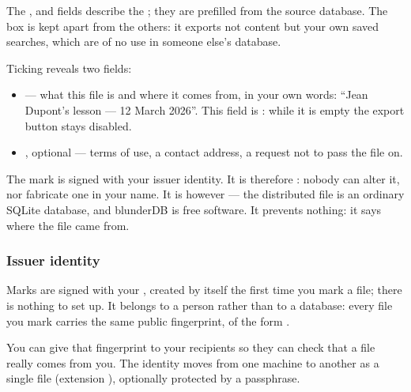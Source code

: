 \documentclass[letterpaper,10pt,english]{sphinxmanual}
\begin{document}
\sphinxAtStartPar
The ,  and  fields describe the ; they are pre\sphinxhyphen{}filled from the source database. The  box is kept apart from the others: it exports not content but your own saved searches, which are of no use in someone else’s database.

\sphinxAtStartPar
Ticking  reveals two fields:
\begin{itemize}
\item {} 
\sphinxAtStartPar
{} — what this file is and where it comes from, in your own words: “Jean Dupont’s lesson — 12 March 2026”. This field is : while it is empty the export button stays disabled.

\item {} 
\sphinxAtStartPar
{}, optional — terms of use, a contact address, a request not to pass the file on.

\end{itemize}

\sphinxAtStartPar
The mark is signed with your issuer identity. It is therefore : nobody can alter it, nor fabricate one in your name. It is however  — the distributed file is an ordinary SQLite database, and blunderDB is free software. It prevents nothing: it says where the file came from.


\subsubsection{Issuer identity}
\label{\detokenize{manuel:identite-d-emetteur}}
\sphinxAtStartPar
Marks are signed with your , created by itself the first time you mark a file; there is nothing to set up. It belongs to a person rather than to a database: every file you mark carries the same public fingerprint, of the form .

\sphinxAtStartPar
You can give that fingerprint to your recipients so they can check that a file really comes from you. The identity moves from one machine to another as a single file (extension ), optionally protected by a passphrase. 
\end{document}
